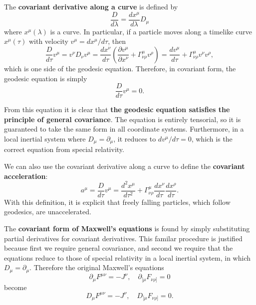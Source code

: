 \documentclass[11pt]{article}
\begin{document}
The \textbf{covariant derivative along a curve} is defined by
$$ \frac{D}{d\lambda} = \frac{dx^\mu}{d\lambda} D_\mu $$
where $x^\mu (\lambda)$ is a curve.
In particular, if a particle moves along a timelike curve $x^\mu(\tau)$ with velocity $v^\mu = dx^\mu/d\tau$, then
$$ \frac{D}{d\tau} v^\mu = v^\nu D_\nu v^\mu = \frac{dx^\nu}{d\tau} \left( \frac{\partial v^\mu}{\partial x^\nu} + \Gamma^\mu_{\nu \rho} v^\rho \right) = \frac{d v^\mu}{d \tau} + \Gamma^\mu_{\nu \rho} v^\nu v^\rho, $$
which is one side of the geodesic equation.
Therefore, in covariant form, the geodesic equation is simply
$$ \frac{D}{d\tau} v^\mu = 0. $$

From this equation it is clear that \textbf{the geodesic equation satisfies the principle of general covariance}.
The equation is entirely tensorial, so it is guaranteed to take the same form in all coordinate systems.
Furthermore, in a local inertial system where $D_\mu = \partial_\mu$, it reduces to $dv^\mu/d\tau = 0$, which is the correct equation from special relativity.

We can also use the covariant derivative along a curve to define the \textbf{covariant acceleration}:
$$ a^\mu = \frac{D}{d\tau} v^\mu = \frac{d^2 x^\mu}{d \tau^2} + \Gamma^\mu_{\nu \rho} \frac{dx^\nu}{d\tau} \frac{dx^\rho}{d\tau}. $$
With this definition, it is explicit that freely falling particles, which follow geodesics, are unaccelerated.

The \textbf{covariant form of Maxwell's equations} is found by simply substituting partial derivatives for covariant derivatives.
This familar procedure is justified because first we require general covariance, and second we require that the equations reduce to those of special relativity in a local inertial system, in which $D_\mu = \partial_\mu$.
Therefore the original Maxwell's equations
$$ \partial_\mu F^{\mu \nu} = -J^\nu, \quad \partial_{[\mu}F_{\nu \rho]} = 0 $$
become
$$ D_\mu F^{\mu \nu} = -J^\nu, \quad D_{[\mu}F_{\nu \rho]} = 0. $$
\end{document}
